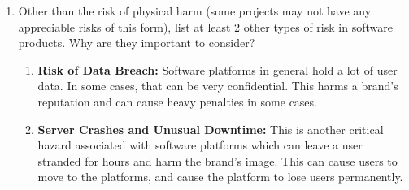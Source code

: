 \documentclass{article}
\begin{document}
\begin{enumerate}
    \item Other than the risk of physical harm (some projects may not have any
    appreciable risks of this form), list at least 2 other types of risk in
    software products. Why are they important to consider?\\
    \begin{enumerate}
    \item \textbf{Risk of Data Breach:} Software platforms in general hold a lot of user data. In some cases, that can be very confidential. This harms a brand's reputation and can cause heavy penalties in some cases.  
    \item \textbf{Server Crashes and Unusual Downtime:} This is another critical hazard associated with software platforms which can leave a user stranded for hours and harm the brand's image. This can cause users to move to the platforms, and cause the platform to lose users permanently.
    \end{enumerate}



\end{enumerate}
\end{document}
